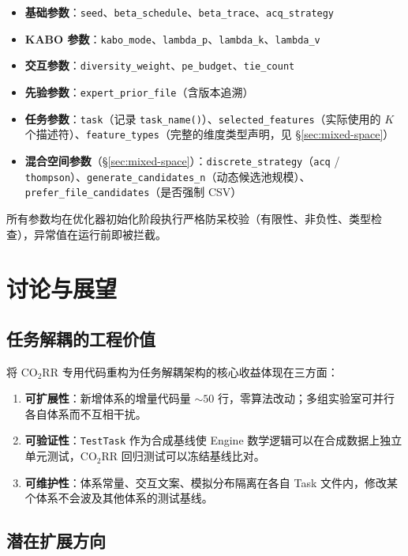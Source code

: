 \documentclass[12pt,a4paper]{article}
\begin{document}
\begin{itemize}
    \item \textbf{基础参数}：\texttt{seed}、\texttt{beta\_schedule}、\texttt{beta\_trace}、\texttt{acq\_strategy}
    \item \textbf{KABO 参数}：\texttt{kabo\_mode}、\texttt{lambda\_p}、\texttt{lambda\_k}、\texttt{lambda\_v}
    \item \textbf{交互参数}：\texttt{diversity\_weight}、\texttt{pe\_budget}、\texttt{tie\_count}
    \item \textbf{先验参数}：\texttt{expert\_prior\_file}（含版本追溯）
    \item \textbf{任务参数}：\texttt{task}（记录 \texttt{task\_name()}）、\texttt{selected\_features}（实际使用的 $K$ 个描述符）、\texttt{feature\_types}（完整的维度类型声明，见 §\ref{sec:mixed-space}）
    \item \textbf{混合空间参数}（§\ref{sec:mixed-space}）：\texttt{discrete\_strategy}（\texttt{acq} / \texttt{thompson}）、\texttt{generate\_candidates\_n}（动态候选池规模）、\texttt{prefer\_file\_candidates}（是否强制 CSV）
\end{itemize}

所有参数均在优化器初始化阶段执行严格防呆校验（有限性、非负性、类型检查），异常值在运行前即被拦截。


\section{讨论与展望}

\subsection{任务解耦的工程价值}

将 CO$_2$RR 专用代码重构为任务解耦架构的核心收益体现在三方面：

\begin{enumerate}
    \item \textbf{可扩展性}：新增体系的增量代码量 $\sim 50$ 行，零算法改动；多组实验室可并行各自体系而不互相干扰。
    \item \textbf{可验证性}：\texttt{TestTask} 作为合成基线使 Engine 数学逻辑可以在合成数据上独立单元测试，CO$_2$RR 回归测试可以冻结基线比对。
    \item \textbf{可维护性}：体系常量、交互文案、模拟分布隔离在各自 Task 文件内，修改某个体系不会波及其他体系的测试基线。
\end{enumerate}

\subsection{潜在扩展方向}
\end{document}

